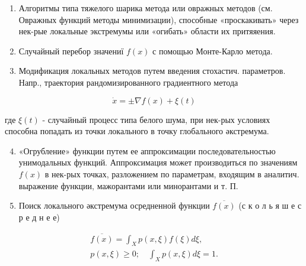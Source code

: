 \documentclass[10pt]{article}
\begin{document}
\begin{enumerate}

  \item Алгоритмы типа тяжелого шарика метода или овражных методов (см. Овражных функций методы минимизации), способные «проскакивать» через нек-рые локальные экстремумы или «огибать» области их притяяения.



  \item Случайный перебор значениї $f(x)$ с помощью Монте-Карло метода.



  \item Модификация локальных методов путем введения стохастич. параметров. Напр., траектория рандомизированного градиентного метода



\end{enumerate}



\[

\dot{x}= \pm \nabla f(x)+\xi(t)

\]



где $\xi(t)$ - случайный процесс типа белого шума, при нек-рых условиях способна попадать из точки локального в точку глобального әкстремума.



\begin{enumerate}

  \setcounter{enumi}{3}

  \item «Огрубление» функции путем ее аппроксимации последовательностью унимодальных функций. Аппроксимация может производиться по значениям $f(x)$ в нек-рых точках, разложением по параметрам, входящим в аналитич. выражение функции, мажорантами или минорантами и т. П.



  \item Поиск локального әкстремума осредненной функции $\overline{f(x)}$ (с к о л ь я ш е с р е д н е е)



\end{enumerate}



\[

\begin{gathered}

\overline{f(x)}=\int_{X} p(x, \xi) f(\xi) d \xi, \\

p(x, \xi) \geqslant 0 ; \quad \int_{X} p(x, \xi) d \xi=1 .

\end{gathered}

\]
\end{document}
